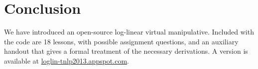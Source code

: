 \documentclass[11pt,letterpaper]{article}
\newcommand{\Note}[1]{}
\renewcommand{\Note}[1]{\hl{[#1]}}
\newcommand{\NoteSigned}[3]{{\sethlcolor{#2}\Note{#1: #3}}}
\newcommand{\NoteFF}[1]{\NoteSigned{FF}{LightBlue}{#1}}
\newcommand{\NoteJE}[1]{\NoteSigned{JE}{LightGreen}{#1}}
\newcommand{\Commented}[1]{}
\newcommand{\WhereToFind}[0]{\url{loglin-tnlp2013.appspot.com}}
\newcommand{\NumLessons}[0]{18}%
\begin{document}

\section{Conclusion}
We have introduced an open-source log-linear virtual manipulative. Included with the code are
\NumLessons{} lessons, with possible assignment questions, and an auxiliary handout that 
gives a formal treatment of the necessary derivations.
A version is available at \WhereToFind{}.

%
%
%
%
\end{document}
